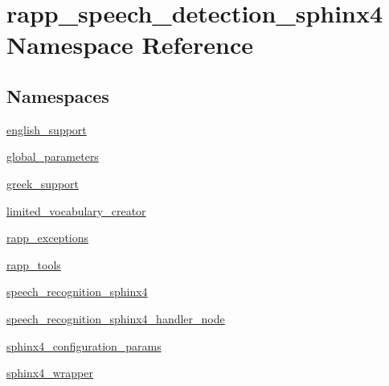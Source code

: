 \hypertarget{namespacerapp__speech__detection__sphinx4}{\section{rapp\-\_\-speech\-\_\-detection\-\_\-sphinx4 Namespace Reference}
\label{namespacerapp__speech__detection__sphinx4}
}
\subsection*{Namespaces}
\begin{DoxyCompactItemize}
\item 
\hyperlink{namespacerapp__speech__detection__sphinx4_1_1english__support}{english\-\_\-support}
\item 
\hyperlink{namespacerapp__speech__detection__sphinx4_1_1global__parameters}{global\-\_\-parameters}
\item 
\hyperlink{namespacerapp__speech__detection__sphinx4_1_1greek__support}{greek\-\_\-support}
\item 
\hyperlink{namespacerapp__speech__detection__sphinx4_1_1limited__vocabulary__creator}{limited\-\_\-vocabulary\-\_\-creator}
\item 
\hyperlink{namespacerapp__speech__detection__sphinx4_1_1rapp__exceptions}{rapp\-\_\-exceptions}
\item 
\hyperlink{namespacerapp__speech__detection__sphinx4_1_1rapp__tools}{rapp\-\_\-tools}
\item 
\hyperlink{namespacerapp__speech__detection__sphinx4_1_1speech__recognition__sphinx4}{speech\-\_\-recognition\-\_\-sphinx4}
\item 
\hyperlink{namespacerapp__speech__detection__sphinx4_1_1speech__recognition__sphinx4__handler__node}{speech\-\_\-recognition\-\_\-sphinx4\-\_\-handler\-\_\-node}
\item 
\hyperlink{namespacerapp__speech__detection__sphinx4_1_1sphinx4__configuration__params}{sphinx4\-\_\-configuration\-\_\-params}
\item 
\hyperlink{namespacerapp__speech__detection__sphinx4_1_1sphinx4__wrapper}{sphinx4\-\_\-wrapper}
\end{DoxyCompactItemize}
